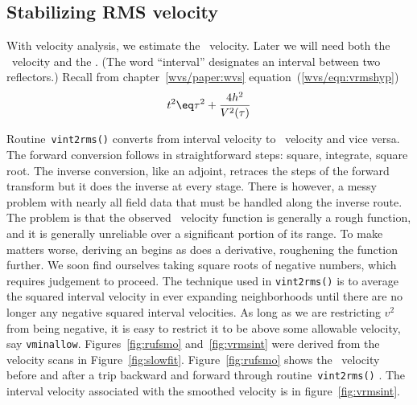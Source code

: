 \subsection{Stabilizing RMS velocity}
\par
{}
With velocity analysis, we estimate the \RMS\ velocity.
Later we will need both the \RMS\ velocity and the .
(The word ``interval'' designates an interval between two reflectors.)
Recall from chapter~\ref{wvs/paper:wvs} equation~(\ref{wvs/eqn:vrmshyp})
$$
t^2 \eq \tau^2 + \frac{4h^2}{V^2(\tau)}  \nonumber
$$
\par
Routine~\texttt{vint2rms()} 
converts from interval velocity to \RMS\ velocity
and vice versa.
The forward conversion follows 
in straightforward steps: square, integrate, square root.
The inverse conversion, like an adjoint,
retraces the steps of the forward transform
but it does the inverse at every stage.
There is however,
a messy problem with nearly all field data
that must be handled along the inverse route.
The problem is that the observed \RMS\ velocity function
is generally a rough function,
and it is generally unreliable over a significant portion of its range.
To make matters worse,
deriving an  begins as does a derivative,
roughening the function further.
We soon find ourselves taking square roots of negative numbers,
which requires judgement to proceed.
The technique used in \texttt{vint2rms()} 
is to average the squared interval velocity
in ever expanding neighborhoods until there are no longer
any negative squared interval velocities.
As long as we are restricting $v^2$ from being negative,
it is easy to restrict it to be above some allowable velocity,
say {\tt vminallow}.
Figures~\ref{fig:rufsmo} and~\ref{fig:vrmsint}
were derived from the velocity scans in Figure~\ref{fig:slowfit}. %
%
Figure~\ref{fig:rufsmo} shows the \RMS\ velocity before and after
a trip backward and forward through routine~\texttt{vint2rms()} .
The interval velocity associated with the smoothed velocity
is in figure~\ref{fig:vrmsint}.
	

